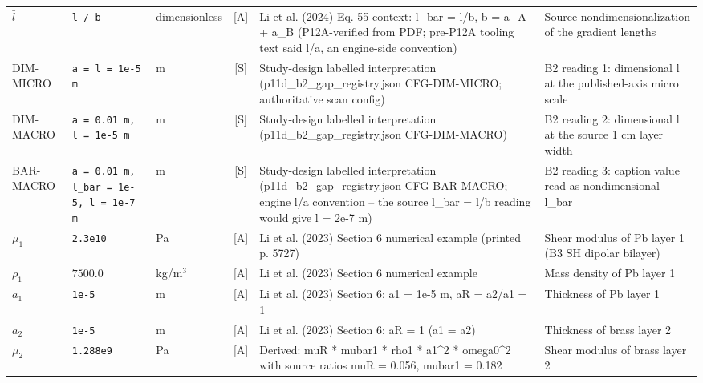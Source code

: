 \begin{xltabular}{\textwidth}{@{}l >{\raggedright\arraybackslash}p{2.2cm} >{\raggedright\arraybackslash}p{2.4cm} c L{2.6cm} Y@{}}
$\bar{l}$ & \texttt{l / b} & dimensionless & [A] & Li et al. (2024) Eq. 55 context: l\_\hspace{0pt}bar = l/b, b = a\_\hspace{0pt}A + a\_\hspace{0pt}B (P12A-verified from PDF; pre-P12A tooling text said l/a, an engine-side convention) & Source nondimensionalization of the gradient lengths \\
DIM-MICRO & \texttt{a = l = 1e-5 m} & m & [S] & Study-design labelled interpretation (p11d\_\hspace{0pt}b2\_\hspace{0pt}gap\_\hspace{0pt}registry.json CFG-DIM-MICRO; authoritative scan config) & B2 reading 1: dimensional l at the published-axis micro scale \\
DIM-MACRO & \texttt{a = 0.01 m, l = 1e-5 m} & m & [S] & Study-design labelled interpretation (p11d\_\hspace{0pt}b2\_\hspace{0pt}gap\_\hspace{0pt}registry.json CFG-DIM-MACRO) & B2 reading 2: dimensional l at the source 1 cm layer width \\
BAR-MACRO & \texttt{a = 0.01 m, l\_\hspace{0pt}bar = 1e-5, l = 1e-7 m} & m & [S] & Study-design labelled interpretation (p11d\_\hspace{0pt}b2\_\hspace{0pt}gap\_\hspace{0pt}registry.json CFG-BAR-MACRO; engine l/a convention -- the source l\_\hspace{0pt}bar = l/b reading would give l = 2e-7 m) & B2 reading 3: caption value read as nondimensional l\_\hspace{0pt}bar \\
$\mu_1$ & \texttt{2.3e10} & Pa & [A] & Li et al. (2023) Section 6 numerical example (printed p. 5727) & Shear modulus of Pb layer 1 (B3 SH dipolar bilayer) \\
$\rho_1$ & $7500.0$ & kg/m$^3$ & [A] & Li et al. (2023) Section 6 numerical example & Mass density of Pb layer 1 \\
$a_1$ & \texttt{1e-5} & m & [A] & Li et al. (2023) Section 6: a1 = 1e-5 m, aR = a2/a1 = 1 & Thickness of Pb layer 1 \\
$a_2$ & \texttt{1e-5} & m & [A] & Li et al. (2023) Section 6: aR = 1 (a1 = a2) & Thickness of brass layer 2 \\
$\mu_2$ & \texttt{1.288e9} & Pa & [A] & Derived: muR * mubar1 * rho1 * a1\textasciicircum{}2 * omega0\textasciicircum{}2 with source ratios muR = 0.056, mubar1 = 0.182 & Shear modulus of brass layer 2 \\

\end{xltabular}

